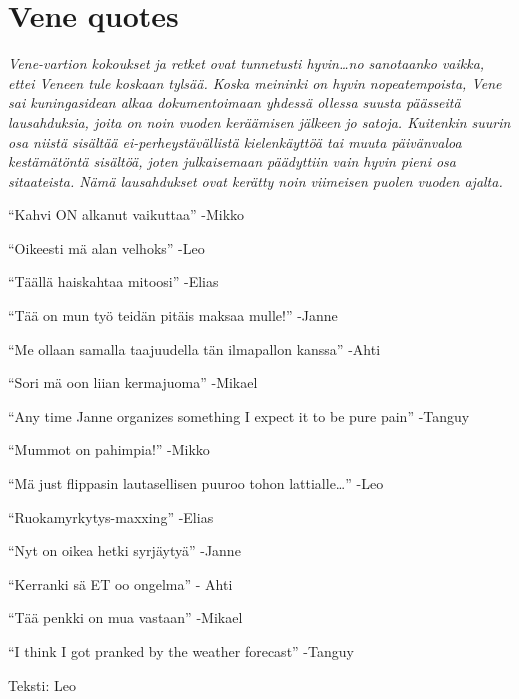 
\section{Vene quotes}

\textit{Vene-vartion kokoukset ja retket ovat tunnetusti hyvin…no sanotaanko vaikka,
ettei Veneen tule koskaan tylsää. Koska meininki on hyvin nopeatempoista, Vene
sai kuningasidean alkaa dokumentoimaan yhdessä ollessa suusta päässeitä
lausahduksia, joita on noin vuoden keräämisen jälkeen jo satoja. Kuitenkin
suurin osa niistä sisältää ei-perheystävällistä kielenkäyttöä tai muuta
päivänvaloa kestämätöntä sisältöä, joten julkaisemaan päädyttiin vain hyvin
pieni osa sitaateista. Nämä lausahdukset ovat kerätty noin viimeisen puolen
vuoden ajalta.}

\vspace{0.64cm}
“Kahvi ON alkanut vaikuttaa” -Mikko

\smallskip
“Oikeesti mä alan velhoks” -Leo

\smallskip
“Täällä haiskahtaa mitoosi” -Elias

\smallskip
“Tää on mun työ teidän pitäis maksaa mulle!” -Janne

\smallskip
“Me ollaan samalla taajuudella tän ilmapallon kanssa” -Ahti

\smallskip
“Sori mä oon liian kermajuoma” -Mikael

\smallskip
“Any time Janne organizes something I expect it to be pure pain” -Tanguy

\smallskip
“Mummot on pahimpia!” -Mikko

\smallskip
“Mä just flippasin lautasellisen puuroo tohon lattialle…” -Leo

\smallskip
“Ruokamyrkytys-maxxing” -Elias

\smallskip
“Nyt on oikea hetki syrjäytyä” -Janne

\smallskip
“Kerranki sä ET oo ongelma” - Ahti

\smallskip
“Tää penkki on mua vastaan” -Mikael

\smallskip
“I think I got pranked by the weather forecast” -Tanguy

\vspace{2.56cm}
\noindent\null\hfill Teksti: Leo
